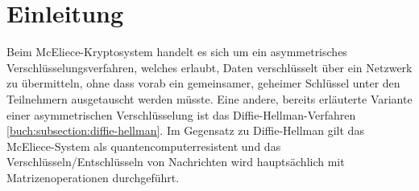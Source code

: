 %
%
%
\section{Einleitung
\label{mceliece:section:einleitung}}
Beim McEliece-Kryptosystem handelt es sich um ein asymmetrisches Verschlüsselungsverfahren, welches erlaubt,
Daten verschlüsselt über ein Netzwerk zu übermitteln, ohne dass vorab ein gemeinsamer,
geheimer Schlüssel unter den Teilnehmern ausgetauscht werden müsste.
Eine andere, bereits erläuterte Variante einer asymmetrischen Verschlüsselung ist das Diffie-Hellman-Verfahren \ref{buch:subsection:diffie-hellman}.
Im Gegensatz zu Diffie-Hellman gilt das McEliece-System als quantencomputerresistent
und das Verschlüsseln/Entschlüsseln von Nachrichten wird hauptsächlich mit Matrizenoperationen durchgeführt.


